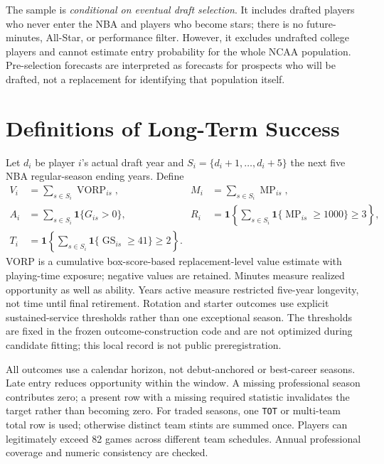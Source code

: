 \documentclass[11pt]{article}
\begin{document}
\begin{table}[htbp]
\centering\small

\caption{Eligible college draftees by actual draft year. Physical height availability does not determine inclusion. ``No NBA record'' is an assumed zero outcome, not an independently proven absence.}
\end{table}

The sample is \emph{conditional on eventual draft selection}. It includes drafted players who never enter the NBA and players who become stars; there is no future-minutes, All-Star, or performance filter. However, it excludes undrafted college players and cannot estimate entry probability for the whole NCAA population. Pre-selection forecasts are interpreted as forecasts for prospects who will be drafted, not a replacement for identifying that population itself.

\section{Definitions of Long-Term Success}
Let $d_i$ be player $i$'s actual draft year and $S_i=\{d_i+1,\ldots,d_i+5\}$ the next five NBA regular-season ending years. Define
\begin{align}
V_i &= \sum_{s\in S_i} \operatorname{VORP}_{is}, &
M_i &= \sum_{s\in S_i} \operatorname{MP}_{is},\\
A_i &= \sum_{s\in S_i} \mathbf{1}\{G_{is}>0\}, &
R_i &= \mathbf{1}\!\left\{\sum_{s\in S_i}\mathbf{1}\{\operatorname{MP}_{is}\geq1000\}\geq3\right\},\\
T_i &= \mathbf{1}\!\left\{\sum_{s\in S_i}\mathbf{1}\{\operatorname{GS}_{is}\geq41\}\geq2\right\}.&&
\end{align}
VORP is a cumulative box-score-based replacement-level value estimate with playing-time exposure; negative values are retained. Minutes measure realized opportunity as well as ability. Years active measure restricted five-year longevity, not time until final retirement. Rotation and starter outcomes use explicit sustained-service thresholds rather than one exceptional season. The thresholds are fixed in the frozen outcome-construction code and are not optimized during candidate fitting; this local record is not public preregistration.

All outcomes use a calendar horizon, not debut-anchored or best-career seasons. Late entry reduces opportunity within the window. A missing professional season contributes zero; a present row with a missing required statistic invalidates the target rather than becoming zero. For traded seasons, one \texttt{TOT} or multi-team total row is used; otherwise distinct team stints are summed once. Players can legitimately exceed 82 games across different team schedules. Annual professional coverage and numeric consistency are checked.
\end{document}

